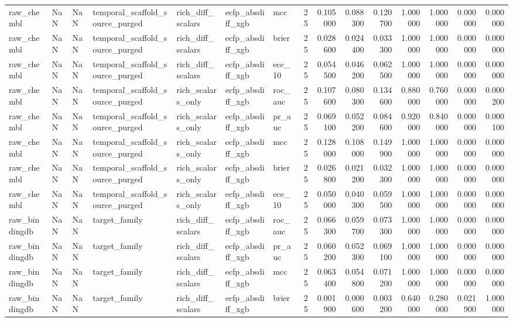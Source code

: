 \begin{longtable}{lllllllrrrrrrrr}
raw\_chembl & NaN & NaN & temporal\_scaffold\_source\_purged & rich\_diff\_scalars & ecfp\_absdiff\_xgb & mcc & 25 & 0.105000 & 0.088300 & 0.120700 & 1.000000 & 1.000000 & 0.000000 & 0.000000 \\
raw\_chembl & NaN & NaN & temporal\_scaffold\_source\_purged & rich\_diff\_scalars & ecfp\_absdiff\_xgb & brier & 25 & 0.028600 & 0.024400 & 0.033300 & 1.000000 & 1.000000 & 0.000000 & 0.000000 \\
raw\_chembl & NaN & NaN & temporal\_scaffold\_source\_purged & rich\_diff\_scalars & ecfp\_absdiff\_xgb & ece\_10 & 25 & 0.054500 & 0.046200 & 0.062500 & 1.000000 & 1.000000 & 0.000000 & 0.000000 \\
raw\_chembl & NaN & NaN & temporal\_scaffold\_source\_purged & rich\_scalars\_only & ecfp\_absdiff\_xgb & roc\_auc & 25 & 0.107600 & 0.080300 & 0.134600 & 0.880000 & 0.760000 & 0.000000 & 0.000200 \\
raw\_chembl & NaN & NaN & temporal\_scaffold\_source\_purged & rich\_scalars\_only & ecfp\_absdiff\_xgb & pr\_auc & 25 & 0.069100 & 0.052200 & 0.084600 & 0.920000 & 0.840000 & 0.000000 & 0.000100 \\
raw\_chembl & NaN & NaN & temporal\_scaffold\_source\_purged & rich\_scalars\_only & ecfp\_absdiff\_xgb & mcc & 25 & 0.128000 & 0.108000 & 0.149900 & 1.000000 & 1.000000 & 0.000000 & 0.000000 \\
raw\_chembl & NaN & NaN & temporal\_scaffold\_source\_purged & rich\_scalars\_only & ecfp\_absdiff\_xgb & brier & 25 & 0.026800 & 0.021200 & 0.032300 & 1.000000 & 1.000000 & 0.000000 & 0.000000 \\
raw\_chembl & NaN & NaN & temporal\_scaffold\_source\_purged & rich\_scalars\_only & ecfp\_absdiff\_xgb & ece\_10 & 25 & 0.050000 & 0.040300 & 0.059500 & 1.000000 & 1.000000 & 0.000000 & 0.000000 \\
raw\_bindingdb & NaN & NaN & target\_family & rich\_diff\_scalars & ecfp\_absdiff\_xgb & roc\_auc & 25 & 0.066300 & 0.059700 & 0.073300 & 1.000000 & 1.000000 & 0.000000 & 0.000000 \\
raw\_bindingdb & NaN & NaN & target\_family & rich\_diff\_scalars & ecfp\_absdiff\_xgb & pr\_auc & 25 & 0.060200 & 0.052300 & 0.069100 & 1.000000 & 1.000000 & 0.000000 & 0.000000 \\
raw\_bindingdb & NaN & NaN & target\_family & rich\_diff\_scalars & ecfp\_absdiff\_xgb & mcc & 25 & 0.063400 & 0.054800 & 0.071200 & 1.000000 & 1.000000 & 0.000000 & 0.000000 \\
raw\_bindingdb & NaN & NaN & target\_family & rich\_diff\_scalars & ecfp\_absdiff\_xgb & brier & 25 & 0.001900 & 0.000600 & 0.003200 & 0.640000 & 0.280000 & 0.021900 & 1.000000 \\

\end{longtable}
